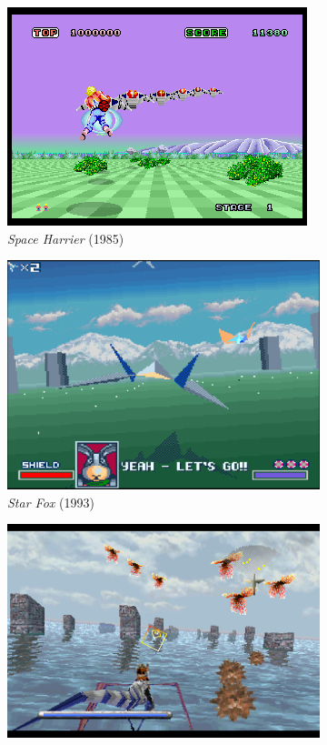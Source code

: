 \documentclass[11pt]{article}
\begin{document}
\begin{figure}[h]
\begin{subfigure}{.5\textwidth}
  \centering
  \includegraphics[width=.8\linewidth]{spaceharrier}
  \caption{\textit{Space Harrier} (1985)}
  \label{fig:sfig1}
\end{subfigure}
\begin{subfigure}{.5\textwidth}
  \centering
  \includegraphics[width=.8\linewidth]{star_fox}
  \caption{\textit{Star Fox} (1993)}
  \label{fig:sfig2}
\end{subfigure}
\begin{subfigure}{.5\textwidth}
  \centering
  \includegraphics[width=.8\linewidth]{panzerdragoon}

\end{subfigure}
\end{figure}
\end{document}
